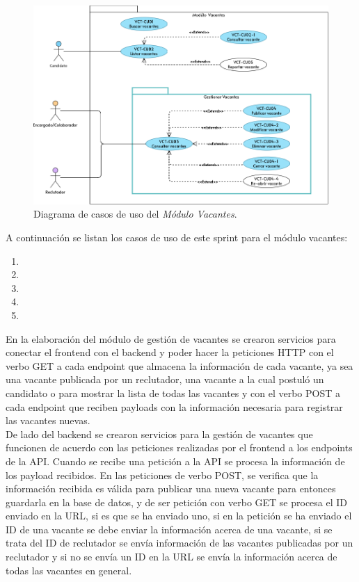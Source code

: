 \begin{figure}[H]
    \begin{center}
        \includegraphics[width=.7\textwidth]{sprints/imagenes/MUVCT.png}
    \end{center}
    \caption{Diagrama de casos de uso del \textit{Módulo Vacantes}.}
    \label{dcu:MUVCT}
\end{figure}

A continuación se listan los casos de uso de este sprint para el módulo vacantes:
\begin{enumerate}
    \item {}
    \item {} 
    \item {} 
    \item {}
    \item {}
\end{enumerate} 



En la elaboración del módulo de gestión de vacantes se crearon servicios para conectar el frontend con el backend y poder hacer la peticiones HTTP con el verbo GET a cada endpoint que almacena la información de cada vacante, ya sea una vacante publicada por un reclutador, una vacante a la cual postuló un candidato o para mostrar la lista de todas las vacantes y con el verbo POST a cada endpoint que reciben payloads con la información necesaria para registrar las vacantes nuevas. \\
\newline
De lado del backend se crearon servicios para la gestión de vacantes que funcionen de acuerdo con las peticiones realizadas por el frontend a los endpoints de la API. Cuando se recibe una petición a la API se procesa la información de los payload recibidos. En las peticiones de verbo POST, se verifica que la información recibida es válida para publicar una nueva vacante para entonces guardarla en la base de datos, y de ser petición con verbo GET se procesa el ID enviado en la URL, si es que se ha enviado uno, si en la petición se ha enviado el ID de una vacante se debe enviar la información acerca de una vacante, si se trata del ID de reclutador se envía información de las vacantes publicadas por un reclutador y si no se envía un ID en la URL se envía la información acerca de todas las vacantes en general.
